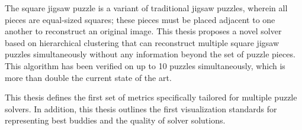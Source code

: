 The square jigsaw puzzle is a variant of traditional jigsaw puzzles, wherein all pieces are equal-sized squares; these pieces must be placed adjacent to one another to reconstruct an original image.  This thesis proposes a novel solver based on hierarchical clustering that can reconstruct multiple square jigsaw puzzles simultaneously without any information beyond the set of puzzle pieces.  This algorithm has been verified on up to 10 puzzles simultaneously, which is more than double the current state of the art.

This thesis defines the first set of metrics specifically tailored for multiple puzzle solvers.  In addition, this thesis outlines the first visualization standards for representing best buddies and the quality of solver solutions.
